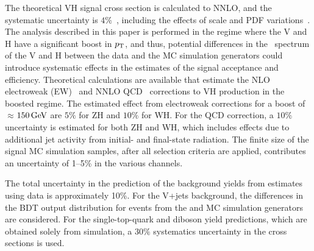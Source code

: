 \documentclass[12pt,twoside,a4paper,cmspaper,final,collab]{cms-tdr}
\begin{document}
 The theoretical VH signal cross section is
        calculated to NNLO,
       and the systematic uncertainty is $4\%$~\cite{LHCHiggsCrossSectionWorkingGroup:2011ti}, including
       the effects of scale and PDF
       variations~\cite{Botje:2011sn,Alekhin:2011sk,Lai:2010vv,Martin:2009iq,Ball:2011mu}.
       The analysis described in this paper is performed
       in the regime where the V and H have a significant boost in $p_{\mathrm{T}}$, and thus, potential differences in
       the \pt\ spectrum of the V and H between the  data and the MC
       simulation generators could introduce systematic effects in the
       estimates of the signal acceptance and efficiency.  Theoretical
       calculations are available that estimate the
       NLO electroweak (EW)~\cite{HAWK1,HAWK2,Denner:2011id} and NNLO
       QCD~\cite{Ferrera:2011bk}
       corrections to VH production in the boosted regime.  The estimated
       effect from electroweak corrections for a boost of $\approx$$150\,\text{Ge\hspace{-.08em}V}$
       are $5\%$ for ZH and $10\%$ for WH.  For the QCD correction, a $10\%$ uncertainty
       is estimated for both ZH and WH, which includes effects due
       to additional jet activity from initial- and final-state radiation. The finite size of the
       signal MC  simulation samples, after all selection criteria are
       applied, contributes an uncertainty  of 1--5\% in the various channels.

The total uncertainty in the prediction of the background yields from
estimates using data is approximately 10\%. For the V+jets background, the
differences in the BDT output distribution for events from
the \MADGRAPH and \HERWIG{++} MC simulation generators are considered.
For the single-top-quark and diboson yield predictions, which are obtained solely
from simulation, a $30\%$ systematics uncertainty in the cross
sections is used.
\end{document}
